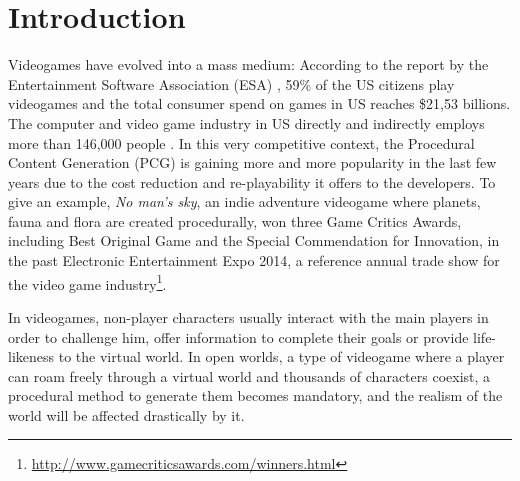 \documentclass[conference]{IEEEtran}
\begin{document}
\section{Introduction}
\label{sec:intro}

Videogames have evolved into a mass medium: According to the report by
the Entertainment Software Association (ESA) \cite{esa_ef_2014}, 59\%
of the US citizens play videogames and the total consumer spend on
games in US reaches \$21,53 billions. The computer and video game
industry in US directly and indirectly employs more than 146,000
people \cite{esa_century_2014}. In this very competitive context, the
Procedural Content Generation (PCG) is gaining more and more
popularity in the last few years due to the cost reduction and
re-playability it offers to the developers. To give an example,
\textit{No man's sky}, an indie adventure videogame where planets,
fauna and flora are created procedurally, won three Game Critics
Awards, including Best Original Game and the Special Commendation for
Innovation, in the past Electronic Entertainment Expo 2014, a
reference annual trade show for the video game
industry\footnote{\url{http://www.gamecriticsawards.com/winners.html}}. 

In videogames, non-player characters usually interact with the main
players in order to challenge him, offer information to complete their
goals or
provide life-likeness to the virtual world. In open worlds, a type of videogame where a player can roam freely through a virtual world and thousands of characters coexist, a procedural method to generate
them becomes mandatory, and the realism of the world will be affected
drastically by it.
\end{document}
